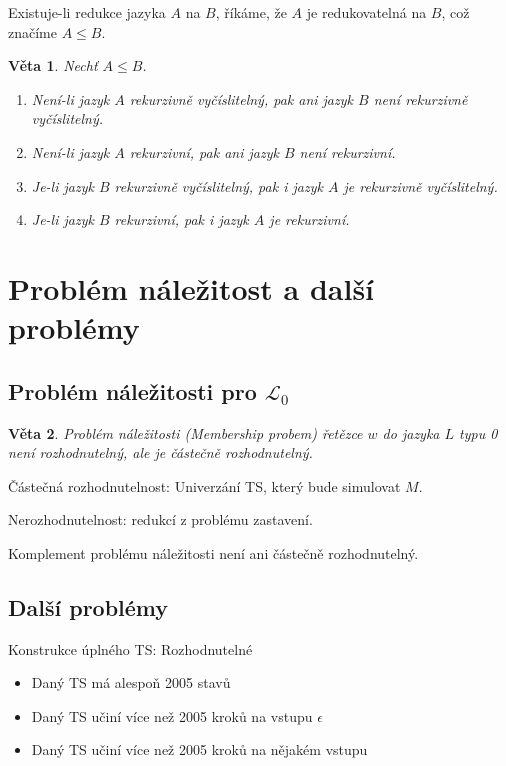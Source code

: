 \documentclass[a4paper, 11pt]{report}
\newtheorem{veta}{Věta}[chapter]
\begin{document}
Existuje-li redukce jazyka $A$ na $B$, říkáme, že $A$ je redukovatelná na $B$, což značíme $A \leq B$.

\begin{veta}
Nechť $A \leq B$.
\begin{enumerate}
	\item Není-li jazyk $A$ rekurzivně vyčíslitelný, pak ani jazyk $B$ není rekurzivně vyčíslitelný.
	\item Není-li jazyk $A$ rekurzivní, pak ani jazyk $B$ není rekurzivní.
	\item Je-li jazyk $B$ rekurzivně vyčíslitelný, pak i jazyk $A$ je rekurzivně vyčíslitelný.
	\item Je-li jazyk $B$ rekurzivní, pak i jazyk $A$ je rekurzivní.
\end{enumerate}
\end{veta}

\section{Problém náležitost a další problémy}

\subsection{Problém náležitosti pro $\mathcal{L}_0$}
\begin{veta}
Problém náležitosti (Membership probem) řetězce $w$ do jazyka $L$ typu 0 \emph{není rozhodnutelný}, ale je \emph{částečně rozhodnutelný}.
\end{veta}
Částečná rozhodnutelnost: Univerzání TS, který bude simulovat $M$.

Nerozhodnutelnost: redukcí z problému zastavení.

Komplement problému náležitosti není ani částečně rozhodnutelný.

\subsection{Další problémy}

Konstrukce úplného TS: Rozhodnutelné
\begin{itemize}
	\item Daný TS má alespoň 2005 stavů
	\item Daný TS učiní více než 2005 kroků na vstupu $\epsilon$
	\item Daný TS učiní více než 2005 kroků na nějakém vstupu
\end{itemize}
\end{document}

